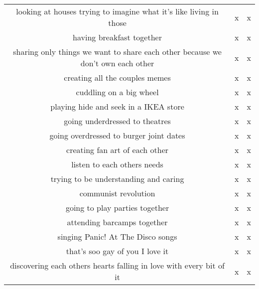 \documentclass[a4paper]{article}
\begin{document}
\begin{table}[htb]
\begin{adjustbox}{width=1\textwidth}
\begin{tabular}{@{}ccc@{}}
        looking at houses trying to imagine what it's like living in those &  x &  x \\
        having breakfast together &  x &  x \\
        sharing only things we want to share each other because we don't own each other &  x &  x \\
        creating all the couples memes &  x &  x \\
        cuddling on a big wheel &  x &  x \\
        playing hide and seek in a IKEA store &  x &  x \\
        going underdressed to theatres &  x &  x \\
        going overdressed to burger joint dates &  x &  x \\
        creating fan art of each other &  x &  x \\
        listen to each others needs &  x &  x \\
        trying to be understanding and caring &  x &  x \\
        communist revolution &  x &  x \\
        going to play parties together &  x &  x \\
        attending barcamps together &  x &  x \\
        singing Panic! At The Disco songs &  x &  x \\
        that's soo gay of you I love it &  x &  x \\
        discovering each others hearts falling in love with every bit of it &  x &  x \\
        \bottomrule
    \end{tabular}
\end{adjustbox}
\end{table}
\end{document}
